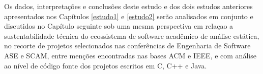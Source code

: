 Os dados, interpretações e conclusões deste estudo e dos dois estudos
anteriores apresentados nos Capítulos \ref{estudo1} e \ref{estudo2} serão
analisados em conjunto e discutidos no Capítulo seguinte sob uma mesma
perspectiva em relaçao a sustentabilidade técnica do ecossistema de software
acadêmico de análise estática, no recorte de projetos selecionados nas
conferências de Engenharia de Software ASE e SCAM, entre menções encontradas
nas bases ACM e IEEE, e com análise ao nível de código fonte dos projetos
escritos em C, C++ e Java.





